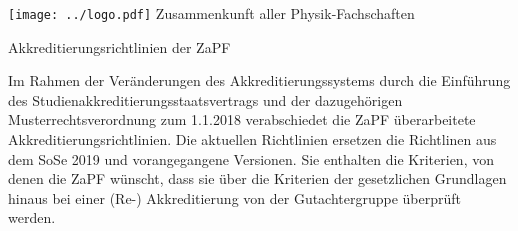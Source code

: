 \documentclass[DIV=calc]{scrartcl}
\begin{document}
	\hspace{0.87\textwidth}
	\begin{minipage}{120pt}
		\vspace{-1.8cm}
		\texttt{[image: ../logo.pdf]}
		\centering
		\small Zusammenkunft aller Physik-Fachschaften
	\end{minipage}
	\begin{center}
		\huge{Akkreditierungsrichtlinien der ZaPF}\vspace{.25\baselineskip}\\
		\normalsize
	\end{center}
	\vspace{1cm}

	Im Rahmen der Veränderungen des Akkreditierungssystems durch die
	Einführung des Studienakkreditierungsstaatsvertrags und der
	dazugehörigen Musterrechtsverordnung zum 1.1.2018 verabschiedet die ZaPF
	überarbeitete Akkreditierungsrichtlinien. Die aktuellen Richtlinien
	ersetzen die Richtlinen aus dem SoSe 2019 und
	vorangegangene Versionen. Sie enthalten die Kriterien, von denen die
	ZaPF wünscht, dass sie über die Kriterien der gesetzlichen Grundlagen
	hinaus bei einer (Re-) Akkreditierung von der Gutachtergruppe überprüft
	werden.
\end{document}
